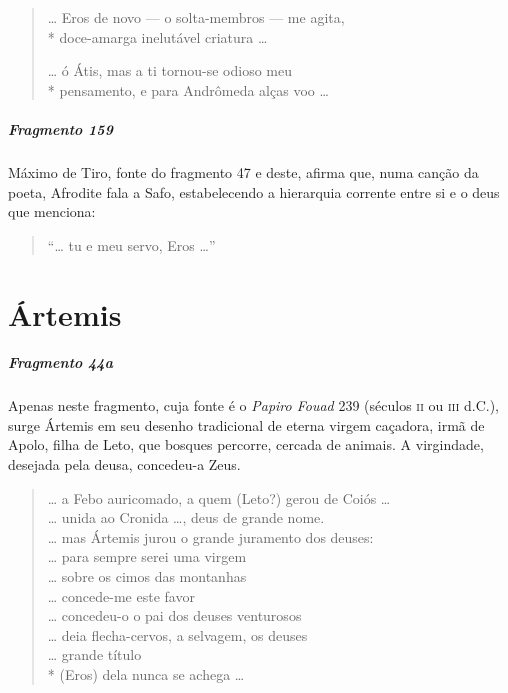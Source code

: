 \begin{verse}
\ldots{} Eros de novo --- o solta-membros --- me agita,\\*
doce-amarga inelutável criatura \ldots{}

\ldots{} ó Átis, mas a ti tornou-se odioso meu\\*
pensamento, e para Andrômeda alças voo \ldots{}
\end{verse}

\paragraph{Fragmento 159}

{\small Máximo de Tiro, fonte do fragmento 47 e deste, afirma que, numa canção da poeta,
Afrodite fala a Safo, estabelecendo a hierarquia corrente entre si e o deus que
menciona:}

\begin{verse}
“\ldots{} tu e meu servo, Eros \ldots{}”
\end{verse}


\chapter{Ártemis}

\paragraph{Fragmento 44a}

{\small Apenas neste fragmento, cuja fonte é o \textit{Papiro Fouad }239 (séculos \textsc{ii} ou
\textsc{iii} d.C.), surge Ártemis em seu desenho tradicional de eterna virgem caçadora,
irmã de Apolo, filha de Leto, que bosques percorre, cercada de animais. A
virgindade, desejada pela deusa, concedeu-a Zeus.}

\begin{verse}
\ldots{} a Febo auricomado, a quem (Leto?) gerou de \qb{}Coiós \ldots{}\\
\ldots{} unida ao Cronida \ldots{}, deus de grande nome.\\
\ldots{} mas Ártemis jurou o grande juramento dos \qb{}deuses:\\
\ldots{} para sempre serei uma virgem\\
\ldots{} sobre os cimos das montanhas\\
\ldots{} concede-me este favor\\
\ldots{} concedeu-o o pai dos deuses venturosos\\
\ldots{} deia flecha-cervos, a selvagem, os deuses\\
\ldots{} grande título\\*
(Eros) dela nunca se achega \ldots{}
\end{verse}


